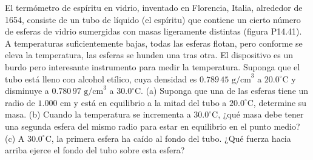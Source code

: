 \item El termómetro de espíritu en vidrio, inventado en Florencia, Italia, alrededor de 1654, consiste de un tubo de líquido (el espíritu) que contiene un cierto número de esferas de vidrio sumergidas con masas ligeramente distintas (figura P14.41). A temperaturas suficientemente bajas, todas las esferas flotan, pero conforme se eleva la temperatura, las esferas se hunden una tras otra. El dispositivo es un burdo pero interesante instrumento para medir la temperatura. Suponga que el tubo está lleno con alcohol etílico, cuya densidad es $0.789\,45 \text{ g/cm}^3$ a $20.0^\circ\text{C}$ y disminuye a $0.780\,97 \text{ g/cm}^3$ a $30.0^\circ\text{C}$. (a) Suponga que una de las esferas tiene un radio de $1.000 \text{ cm}$ y está en equilibrio a la mitad del tubo a $20.0^\circ\text{C}$, determine su masa. (b) Cuando la temperatura se incrementa a $30.0^\circ\text{C}$, ¿qué masa debe tener una segunda esfera del mismo radio para estar en equilibrio en el punto medio? (c) A $30.0^\circ\text{C}$, la primera esfera ha caído al fondo del tubo. ¿Qué fuerza hacia arriba ejerce el fondo del tubo sobre esta esfera?
